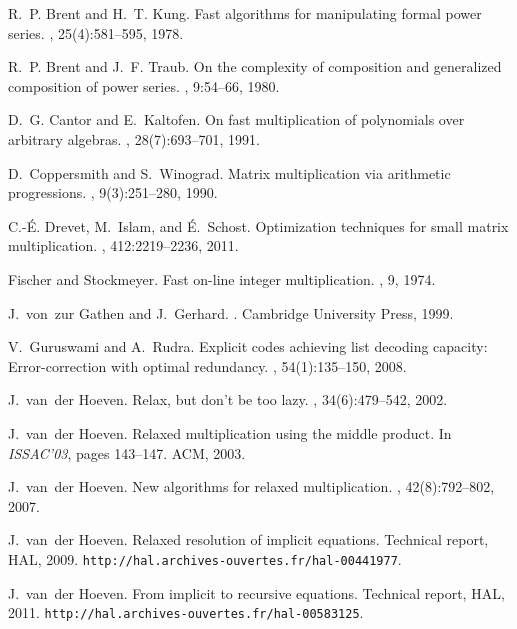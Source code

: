 \documentclass[]{sig-alternate}
\begin{document}
\begin{thebibliography}{10}
R.~P. Brent and H.~T. Kung.
\newblock Fast algorithms for manipulating formal power series.
, 25(4):581--595, 1978.

R.~P. Brent and J.~F. Traub.
\newblock On the complexity of composition and generalized composition of power
  series.
, 9:54--66, 1980.

D.~G. Cantor and E.~Kaltofen.
\newblock On fast multiplication of polynomials over arbitrary algebras.
, 28(7):693--701, 1991.

D.~Coppersmith and S.~Winograd.
\newblock Matrix multiplication via arithmetic progressions.
, 9(3):251--280, 1990.

C.-{\'E}. Drevet, M.~Islam, and {\'E}.~Schost.
\newblock Optimization techniques for small matrix multiplication.
, 412:2219--2236, 2011.

Fischer and Stockmeyer.
\newblock Fast on-line integer multiplication.
, 9, 1974.

J.~von~zur Gathen and J.~Gerhard.
.
\newblock Cambridge University Press, 1999.

V.~Guruswami and A.~Rudra.
\newblock Explicit codes achieving list decoding capacity: Error-correction
  with optimal redundancy.
, 54(1):135--150, 2008.

J.~van~der Hoeven.
\newblock Relax, but don't be too lazy.
, 34(6):479--542, 2002.

J.~van~der Hoeven.
\newblock Relaxed multiplication using the middle product.
\newblock In {\em ISSAC'03}, pages 143--147. ACM, 2003.

J.~van~der Hoeven.
\newblock New algorithms for relaxed multiplication.
, 42(8):792--802, 2007.

J.~van~der Hoeven.
\newblock Relaxed resolution of implicit equations.
\newblock Technical report, HAL, 2009.
\newblock \texttt{{http://hal.archives-ouvertes.fr/hal-00441977}}.

J.~van~der Hoeven.
\newblock From implicit to recursive equations.
\newblock Technical report, HAL, 2011.
\newblock \texttt{{http://hal.archives-ouvertes.fr/hal-00583125}}.


\end{thebibliography}
\end{document}
